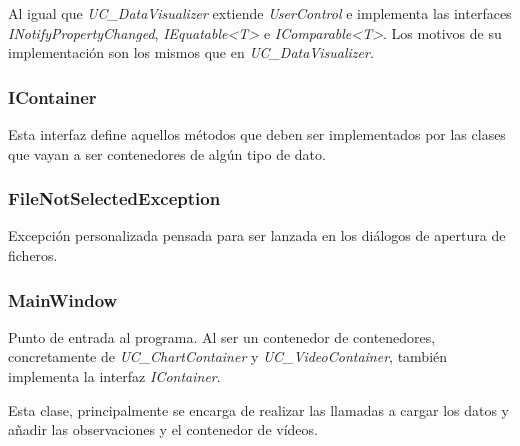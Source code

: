 Al igual que \emph{UC\_DataVisualizer} extiende \emph{UserControl} 
e implementa las interfaces \emph{INotifyPropertyChanged},
\emph{IEquatable<T>} e \emph{IComparable<T>}. Los motivos de su implementaci\'on
son los mismos que en \emph{UC\_DataVisualizer}.

\subsubsection{IContainer}
Esta interfaz define aquellos m\'etodos que deben ser implementados por las clases que vayan a ser contenedores
de alg\'un tipo de dato.

\subsubsection{FileNotSelectedException}
Excepci\'on personalizada pensada para ser lanzada en los di\'alogos de apertura de ficheros.

\subsubsection{MainWindow}
Punto de entrada al programa. Al ser un contenedor de contenedores, concretamente de \emph{UC\_ChartContainer} y
\emph{UC\_VideoContainer}, tambi\'en implementa la interfaz \emph{IContainer}.

Esta clase, principalmente se encarga de realizar las llamadas a cargar los datos y añadir las observaciones
y el contenedor de v\'ideos.